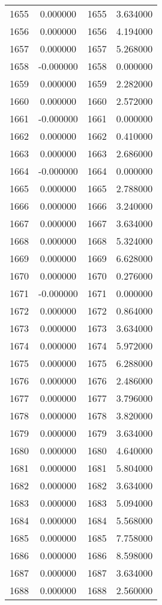 \documentclass[12pt]{article}
\begin{document}
\begin{longtable}{@{}cccc@{}}
1655 & 0.000000 & 1655 & 3.634000 \\
1656 & 0.000000 & 1656 & 4.194000 \\
1657 & 0.000000 & 1657 & 5.268000 \\
1658 & -0.000000 & 1658 & 0.000000 \\
1659 & 0.000000 & 1659 & 2.282000 \\
1660 & 0.000000 & 1660 & 2.572000 \\
1661 & -0.000000 & 1661 & 0.000000 \\
1662 & 0.000000 & 1662 & 0.410000 \\
1663 & 0.000000 & 1663 & 2.686000 \\
1664 & -0.000000 & 1664 & 0.000000 \\
1665 & 0.000000 & 1665 & 2.788000 \\
1666 & 0.000000 & 1666 & 3.240000 \\
1667 & 0.000000 & 1667 & 3.634000 \\
1668 & 0.000000 & 1668 & 5.324000 \\
1669 & 0.000000 & 1669 & 6.628000 \\
1670 & 0.000000 & 1670 & 0.276000 \\
1671 & -0.000000 & 1671 & 0.000000 \\
1672 & 0.000000 & 1672 & 0.864000 \\
1673 & 0.000000 & 1673 & 3.634000 \\
1674 & 0.000000 & 1674 & 5.972000 \\
1675 & 0.000000 & 1675 & 6.288000 \\
1676 & 0.000000 & 1676 & 2.486000 \\
1677 & 0.000000 & 1677 & 3.796000 \\
1678 & 0.000000 & 1678 & 3.820000 \\
1679 & 0.000000 & 1679 & 3.634000 \\
1680 & 0.000000 & 1680 & 4.640000 \\
1681 & 0.000000 & 1681 & 5.804000 \\
1682 & 0.000000 & 1682 & 3.634000 \\
1683 & 0.000000 & 1683 & 5.094000 \\
1684 & 0.000000 & 1684 & 5.568000 \\
1685 & 0.000000 & 1685 & 7.758000 \\
1686 & 0.000000 & 1686 & 8.598000 \\
1687 & 0.000000 & 1687 & 3.634000 \\
1688 & 0.000000 & 1688 & 2.560000 \\

\end{longtable}
\end{document}
